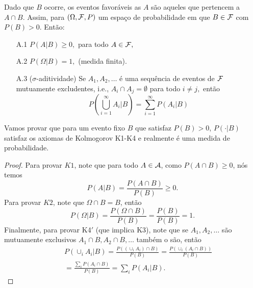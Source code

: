 \begin{frame}
\begin{teo}
	Dado que $B$ ocorre, os eventos favoráveis as $A$ são aqueles que pertencem a $A\cap B.$ Assim, para $(\Omega ,{\cal F}, P)$ um espaço de probabilidade em que $B\in {\cal F}$ com $ P(B)>0$. Então:
	
	\begin{enumerate}
		\item[A.1]$P(A|B)\geq 0,$ para todo $ A\in {\cal F},$
		\item[A.2] $P(\Omega|B)=1,$ (medida finita).
		\item[A.3] ($\sigma$-aditividade) Se $A_1, A_2, \ldots$ é uma sequência de eventos de
		${\cal F}$  mutuamente excludentes, i.e., $A_i\cap A_j=\emptyset$ para todo
		$i\neq j,$ então 
		$$
		\displaystyle
		\label{ax3}
		P\left(\bigcup_{i=1}^\infty A_i \Big | B \right)=\sum_{i=1}^\infty P(A_i|B)
		$$
	\end{enumerate}
\end{teo}
	Vamos provar que para um evento fixo $B$ que satisfaz $P(B)>0$,
$P(\cdot|B)$ satisfaz os axiomas de Kolmogorov K1-K4  e realmente é uma
medida de probabilidade.
\end{frame}


\begin{frame}


\begin{proof}
 Para provar $K1$, note que para todo $A\in
	{\cal A}$, como $P(A\cap B)\geq 0$, nós temos
	$$P(A|B)=\frac{P(A\cap B)}{P(B)}\geq 0.$$
	Para provar $K2$, note que $\Omega\cap B=B$, então
	$$P(\Omega|B)=\frac{P(\Omega\cap B)}{P(B)}=\frac{P(B)}{P(B)}=1.$$
	Finalmente, para provar K4$'$ (que implica K3), note que se
	$A_1,A_2,\ldots$ são mutuamente exclusivos $A_1\cap B,A_2\cap
	B,\ldots$ também o são, então
	\begin{eqnarray}
	& & P(\cup_i A_i|B)=\frac{P((\cup_i A_i)\cap
		B)}{P(B)}=\frac{P(\cup_i(A_i\cap B))}{P(B)} \nonumber
	\\
	& & =\frac{\sum_i P(A_i\cap B)}{P(B)}=\sum_i P(A_i|B). \nonumber
	\end{eqnarray}
\end{proof}	
\end{frame}

